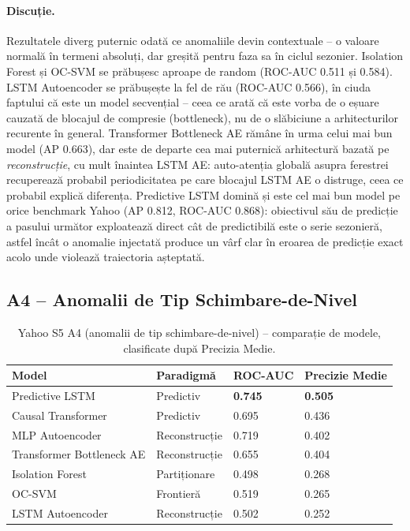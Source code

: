 \paragraph{Discuție.} Rezultatele diverg puternic odată ce anomaliile devin contextuale -- o valoare normală în termeni absoluți, dar greșită pentru faza sa în ciclul sezonier. Isolation Forest și OC-SVM se prăbușesc aproape de random (ROC-AUC 0.511 și 0.584).
LSTM Autoencoder se prăbușește la fel de rău (ROC-AUC 0.566), în ciuda faptului că este un model secvențial -- ceea ce arată că este vorba de o eșuare cauzată de blocajul de compresie (bottleneck), nu de o slăbiciune a arhitecturilor recurente în general.
Transformer Bottleneck AE rămâne în urma celui mai bun model (AP 0.663), dar este de departe cea mai puternică arhitectură bazată pe \emph{reconstrucție}, cu mult înaintea LSTM AE: auto-atenția globală asupra ferestrei recuperează probabil periodicitatea pe care blocajul LSTM AE o distruge, ceea ce probabil explică diferența.
Predictive LSTM domină și este cel mai bun model pe orice benchmark Yahoo (AP 0.812, ROC-AUC 0.868): obiectivul său de predicție a pasului următor exploatează direct cât de predictibilă este o serie sezonieră, astfel încât o anomalie injectată produce un vârf clar în eroarea de predicție exact acolo unde violează traiectoria așteptată.

\subsection{A4 -- Anomalii de Tip Schimbare-de-Nivel}

\begin{table}[h]
\centering
\footnotesize
\begin{tabular}{@{}llll@{}}
\toprule
Model & Paradigmă & ROC-AUC & Precizie Medie \\
\midrule
Predictive LSTM            & Predictiv     & \textbf{0.745} & \textbf{0.505} \\
Causal Transformer         & Predictiv     & 0.695          & 0.436 \\
MLP Autoencoder            & Reconstrucție & 0.719          & 0.402 \\
Transformer Bottleneck AE  & Reconstrucție & 0.655          & 0.404 \\
Isolation Forest           & Partiționare      & 0.498          & 0.268 \\
OC-SVM                     & Frontieră       & 0.519          & 0.265 \\
LSTM Autoencoder           & Reconstrucție & 0.502          & 0.252 \\
\bottomrule
\end{tabular}
\caption{Yahoo S5 A4 (anomalii de tip schimbare-de-nivel) -- comparație de modele, clasificate după Precizia Medie.}
\label{tab:yahoo-a4}
\end{table}

